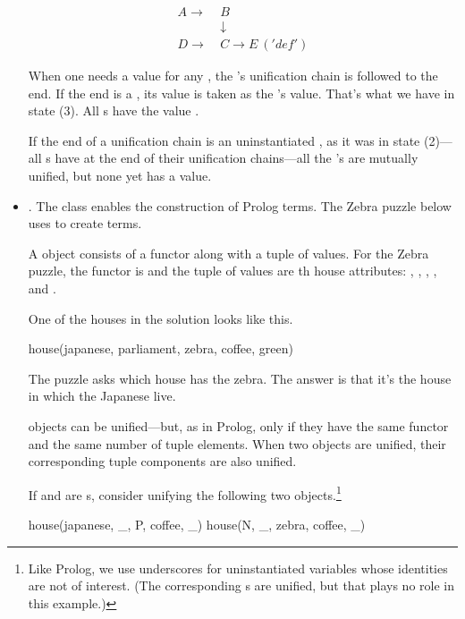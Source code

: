 \begin{itemize}[label=$\bullet$]
\begin{equation}\label{eq:three}
\begin{split}
A \rightarrow \: &B \\
&\downarrow \\
D \rightarrow \: &C \rightarrow E\:('def')
\end{split}
\end{equation}

When one needs a value for any , the 's unification chain is followed to the end. If the end is a , its value is taken as the 's value. That's what we have in state (3). All s have the value . 
\smallv

If the end of a unification chain is an uninstantiated , as it was in state (2)---all s have  at the end of their unification chains---all the 's are mutually unified, but none yet has a value.
\smallv

\item{}. The  class enables the construction of Prolog terms. The Zebra puzzle below uses   to create  terms.
\smallv

A  object consists of a functor along with a tuple of values. For the Zebra puzzle, the functor is  and the tuple of values are th house attributes:  ,  ,  ,  , and  . 
\smallv

One of the houses in the solution looks like this.
\begin{python}
    house(japanese, parliament, zebra, coffee, green)
\end{python}
The puzzle asks which house has the zebra. The answer is that it's the house in which the Japanese live.
\smallv

 objects can be unified---but, as in Prolog, only if they have the same functor and the same number of tuple elements. When two  objects are unified, their corresponding tuple components are also unified. 
\smallv

If  and  are s, consider unifying the following two  objects.\footnote{Like Prolog, we use underscores for uninstantiated variables whose identities are not of interest. (The corresponding s are unified, but that plays no role in this example.)} 
\begin{python}
   house(japanese, _, P, coffee, _)
   house(N, _, zebra, coffee, _)
\end{python}


\end{itemize}
